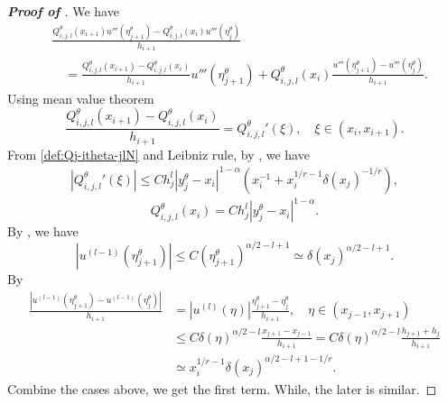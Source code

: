 \documentclass{amsart}
\theoremstyle{definition}
\theoremstyle{remark}
\numberwithin{equation}{section}
\begin{document}
\begin{proof} [\bf Proof of ]
  \label{prf:dQj-itle}
  We have
  \begin{equation}
    \begin{aligned}
       & \frac{{Q_{i,j,l}^\theta}(x_{i+1}) u'''(\eta_{j+1}^\theta) - {Q_{i,j,l}^\theta}(x_{i}) u'''(\eta_{j}^\theta)}{h_{i+1}}  \\
       & \quad = \frac{Q_{i,j,l}^\theta(x_{i+1}) - Q_{i,j,l}^\theta(x_{i})}{h_{i+1}} u'''(\eta_{j+1}^\theta)
      + Q_{i,j,l}^\theta(x_i) \frac{u'''(\eta_{j+1}^\theta)-u'''(\eta_{j}^\theta)}{h_{i+1}}    .
    \end{aligned}
  \end{equation}
  Using mean value theorem
  \begin{equation*}
    \frac{Q_{i,j,l}^\theta(x_{i+1}) - Q_{i,j,l}^\theta(x_{i})}{h_{i+1}} = {Q_{i,j,l}^\theta}'(\xi), \quad \xi \in (x_{i}, x_{i+1}).
  \end{equation*}
  From \eqref{def:Qj-itheta-jlN} and Leibniz rule, by , we have
  \begin{equation*}
    \begin{aligned}
      |{Q_{i,j,l}^\theta}'(\xi)| \le C h_j^l |y_{j}^\theta - x_{i}|^{1-\alpha} (x_i^{-1} + x_i^{1/r-1} \delta(x_j)^{-1/r}),
    \end{aligned}
  \end{equation*}
  \begin{equation*}
    Q_{i,j,l}^\theta(x_i) = C h_{j}^l |y_j^\theta-x_i|^{1-\alpha}.
  \end{equation*}
  By , we have
  \begin{equation*}
    |u^{(l-1)}(\eta_{j+1}^\theta)| \le C (\eta_{j+1}^\theta)^{\alpha/2-l+1} 
    \simeq \delta(x_j)^{\alpha/2-l+1}.
  \end{equation*}
  By 
  \begin{equation*}
    \begin{aligned}
      \frac{|u^{(l-1)}(\eta_{j+1}^\theta)-u^{(l-1)}(\eta_{j}^\theta)|}{h_{i+1}}
      &= |u^{(l)}(\eta)| \frac{\eta_{j+1}^\theta - \eta_{j}^\theta}{h_{i+1}}  , \quad \eta \in (x_{j-1}, x_{j+1})\\
      & \le C \delta(\eta)^{\alpha/2-l} \frac{x_{j+1}-x_{j-1}}{h_{i+1}}
      = C \delta(\eta)^{\alpha/2-l} \frac{h_{j+1}+h_{j}}{h_{i+1}} \\
      & \simeq x_i^{1/r-1} \delta(x_j)^{\alpha/2-l+1-1/r} .
    \end{aligned}
  \end{equation*}
  Combine the cases above, we get the first term.
  While, the later is similar.
\end{proof}
    
\end{document}
